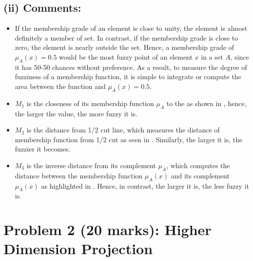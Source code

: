 \documentclass{tron}
\begin{document}
\subsection{(ii) Comments:}
\begin{itemize}
	\item If the membership grade of an element is close to unity, the element is almost definitely a member of set. In contrast, if the membership grade is close to zero, the element is nearly outside the set. Hence, a membership grade of $\mu_A(x)=0.5$ would be the most fuzzy point of an element $x$ in a set $A$, since it has 50-50 chances without preference. As a result, to measure the degree of fuzziness of a membership function, it is simple to integrate or compute the area between the function and $\mu_A(x)=0.5$. 
	\item $M_1$ is the closeness of its membership function $\mu_A$ to the  as shown in , hence, the larger the value, the more fuzzy it is.
	\item $M_2$ is the distance from 1/2 cut line, which measures the distance of membership function from 1/2 cut as seen in . Similarly, the larger it is, the fuzzier it becomes.
	\item $M_3$ is the inverse distance from its complement $\mu_{\bar A}$, which computes the distance between the membership function $\mu_A(x)$ and its complement $\mu_{\bar A}(x)$ as highlighted in . Hence, in contrast, the larger it is, the less fuzzy it is.
\end{itemize}


\clearpage
\section{Problem 2 (20 marks): Higher Dimension Projection}
\end{document}
